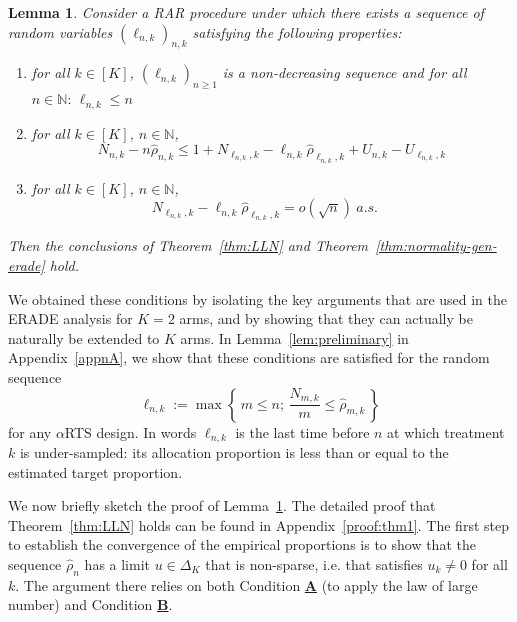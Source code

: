 \documentclass[11pt]{article}
\theoremstyle{plain}
\newtheorem{lemma}[theorem]{Lemma}
\theoremstyle{definition}
\begin{document}
\begin{lemma} \label{lem:generic-conditions-main} Consider a RAR procedure under which there exists a sequence of random variables $(\ell_{n,k})_{n,k}$ satisfying the following properties:
\begin{enumerate}[label=(\roman*)]
		\item for all $k\in [K]$, \(\left(\ell_{n,k}\right)_{n \geq 1}\) is a non-decreasing sequence and for all \(n \in \mathbb{N}: \,\ell_{n,k} \leq n\)
		\item for all $k\in [K]$, $n \in \mathbb{N}$,
		\begin{equation}\label{eq:prelim-sketch}
			N_{n,k} - n\hat{\rho}_{n,k} \leq 1+N_{\ell_{n,k},k} - \ell_{n,k} \hat{\rho}_{\ell_{n,k},k} + U_{n,k} - U_{\ell_{n,k},k}
		\end{equation}
		\item for all $k\in [K]$, $n \in \mathbb{N}$,
		\begin{equation}\label{eq:condition-sketch}
			N_{\ell_{n,k},k} - \ell_{n,k} \hat{\rho}_{\ell_{n,k},k} = o(\sqrt{n}) \ a.s.
			\quad
		\end{equation}
	\end{enumerate}
Then the conclusions of Theorem~\ref{thm:LLN} and Theorem~\ref{thm:normality-gen-erade} hold.
\end{lemma}

We obtained these conditions by isolating the key arguments that are used in the ERADE analysis for $K=2$ arms, and by showing that they can actually be naturally be extended to $K$ arms. In Lemma~\ref{lem:preliminary} in Appendix~\ref{appnA}, we show that these conditions are satisfied for the random sequence
\[\ell_{n,k} := \max \left\{\, m \leq n ; \, \frac{N_{m,k}}{m} \leq \hat{\rho}_{m,k}  \,\right\}\]
for any $\alpha$RTS design. In words $\ell_{n,k}$ is the last time before \(n\) at which treatment \(k\) is under-sampled: its allocation proportion is less than or equal to the estimated target proportion.

\smallskip

We now briefly sketch the proof of Lemma~\ref{lem:generic-conditions-main}. The detailed proof that Theorem~\ref{thm:LLN} holds can be found in Appendix~\ref{proof:thm1}. The first step to establish the convergence of the empirical proportions is to show that the sequence $\hat{\rho}_n$ has a limit $u \in \Delta_K$ that is non-sparse, i.e. that satisfies $u_k \neq 0$ for all $k$. The argument there relies on both Condition \hyperlink{CA}{\textbf{A}} (to apply the law of large number) and Condition \hyperlink{CB}{\textbf{B}}.
\end{document}
